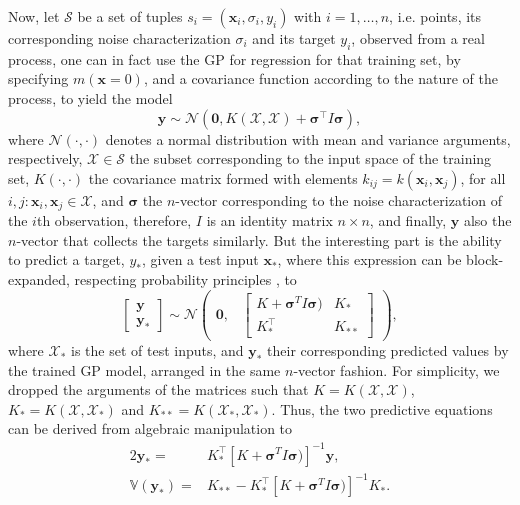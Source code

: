 Now, let $\mathcal{S}$ be a set of tuples $s_i = (\mathbf{x}_i, \sigma_i, y_i)$ with $i=1,\ldots,n$, i.e. points, its corresponding noise characterization $\sigma_i$ and its target $y_i$, observed from a real process, one can in fact use the GP for regression for that training set, by specifying $m(\mathbf{x}=0)$, and a covariance function according to the nature of the process, to yield the model
\begin{equation}
\mathbf{y} \sim \mathcal{N}(\mathbf{0}, K(\mathcal{X},\mathcal{X}) + \boldsymbol{\sigma}^\top I \boldsymbol{\sigma}),
\end{equation}
where $\mathcal{N}(\cdot, \cdot)$ denotes a normal distribution with mean and variance arguments, respectively, $\mathcal{X} \in \mathcal{S}$ the subset corresponding to the input space of the training set,  $K(\cdot, \cdot)$ the covariance matrix formed with elements $k_{ij} = k(\mathbf{x}_i, \mathbf{x}_j)$, for all $i,j : \mathbf{x}_i, \mathbf{x}_j \in \mathcal{X}$, and $\boldsymbol{\sigma}$ the $n$-vector corresponding to the noise characterization of the $i$th observation, therefore, $I$ is an identity matrix $n \times n$, and finally, $\mathbf{y}$ also the $n$-vector that collects the targets similarly. But the interesting part is the ability to predict a target, $y_*$, given a test input $\mathbf{x}_*$, where this expression can be block-expanded, respecting probability principles \citep{Rasmussen2006Gaussian}, to
\begin{equation}
    \begin{bmatrix} \mathbf{y} \\ \mathbf{y}_* \end{bmatrix} \sim
               \mathcal{N}\begin{pmatrix}\mathbf{0}, & \begin{bmatrix} K + \boldsymbol{\sigma}^{T} I \boldsymbol{\sigma}) &
                                                 K_* \\
                                                 K_*^\top &
                                                 K_{**} \end{bmatrix}
                           \end{pmatrix},
\end{equation}
where $\mathcal{X}_*$ is the set of test inputs, and $\mathbf{y}_*$ their corresponding predicted values by the trained GP model, arranged in the same $n$-vector fashion. For simplicity, we dropped the arguments of the matrices such that $K = K(\mathcal{X},\mathcal{X})$, $K_* = K(\mathcal{X},\mathcal{X}_*)$ and $K_{**} = K(\mathcal{X}_*,\mathcal{X}_*)$. Thus, the two  predictive equations can be derived from algebraic manipulation to
\begin{alignat}{2}
	\mathbf{y}_* = & K_*^\top [K + \boldsymbol{\sigma}^{T} I \boldsymbol{\sigma})]^{-1}\mathbf{y}, \label{eq:f_prediction}\\
	\mathbb{V}(\mathbf{y}_*) = & K_{**} - K_*^\top[K + \boldsymbol{\sigma}^{T} I \boldsymbol{\sigma})]^{-1} K_*. \label{eq:variance_f}
\end{alignat}


